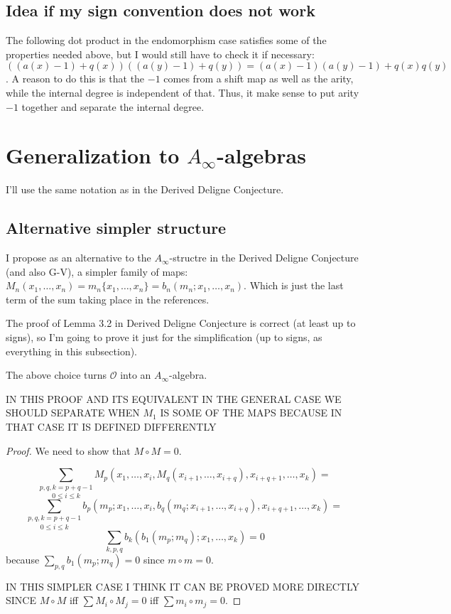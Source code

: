 \documentclass[twoside]{article}
\begin{document}
\subsection{Idea if my sign convention does not work}

The following dot product in the endomorphism case satisfies some of the properties needed above, but I would still have to check it if necessary: $((a(x)-1)+q(x))((a(y)-1)+q(y))=(a(x)-1)(a(y)-1)+q(x)q(y)$. A reason to do this is that the $-1$ comes from a shift map as well as the arity, while the internal degree is independent of that. Thus, it make sense to put arity $-1$ together and separate the internal degree.

\section{Generalization to $A_\infty$-algebras}
I'll use the same notation as in the Derived Deligne Conjecture.

\subsection{Alternative simpler structure}
I propose as an alternative to the $A_\infty$-structre in the Derived Deligne Conjecture (and also G-V), a simpler family of maps: $M_n(x_1,\dots, x_n)=m_n\{x_1,\dots, x_n\}=b_n(m_n;x_1,\dots, x_n)$. Which is just the last term of the sum taking place in the references.

The proof of Lemma 3.2 in Derived Deligne Conjecture is correct (at least up to signs), so I'm going to prove it just for the simplification (up to signs, as everything in this subsection).

\begin{lemma} The above choice turns $\mathcal{O}$ into an $A_\infty$-algebra.
\end{lemma}
IN THIS PROOF AND ITS EQUIVALENT IN THE GENERAL CASE WE SHOULD SEPARATE WHEN $M_1$ IS SOME OF THE MAPS BECAUSE IN THAT CASE IT IS DEFINED DIFFERENTLY
\begin{proof}
We need to show that $M\circ M=0$. 

\[
\underset{0\leq i\leq k}{\sum_{p,q,k=p+q-1}}M_p(x_1,\dots, x_i, M_q(x_{i+1},\dots, x_{i+q}),x_{i+q+1},\dots, x_k)=
\]
\[
\underset{0\leq i\leq k}{\sum_{p,q,k=p+q-1}}b_p(m_p; x_1,\dots, x_i, b_q(m_q;x_{i+1},\dots, x_{i+q}),x_{i+q+1},\dots, x_k)=
\]
\[
\sum_{k,p,q}b_k(b_1(m_p;m_q);x_1,\dots, x_k)=0
\]
because $\sum_{p,q}b_1(m_p;m_q)=0$ since $m\circ m=0$.

IN THIS SIMPLER CASE I THINK IT CAN BE PROVED MORE DIRECTLY SINCE $M\circ M$ iff $\sum M_i\circ M_j=0$ iff $\sum m_i\circ m_j=0$. 
\end{proof}
\end{document}
